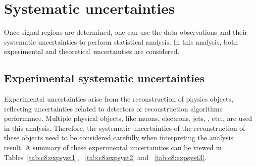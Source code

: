 \chapter{Systematic uncertainties}
\label{ch:sys-unc}

\par Once signal regions are determined, one can use the data observations and their systematic uncertainties to perform statistical analysis. 
In this analysis, both experimental and theoretical uncertainties are considered.

\section{Experimental systematic uncertainties}
\label{sec:exp-sys-unc}

\par Experimental uncertainties arise from the reconstruction of physics objects, reflecting uncertainties related to detectors or reconstruction algorithms performance. 
Multiple physical objects, like muons, electrons, jets, \met, etc., are used in this analysis. 
Therefore, the systematic uncertainties of the reconstruction of these objects need to be considered carefully when interpreting the analysis result. A summary of these experimental 
uncertainties can be viewed in Tables~\ref{tab:c8:expsyst1}, ~\ref{tab:c8:expsyst2} and ~\ref{tab:c8:expsyst3}.

